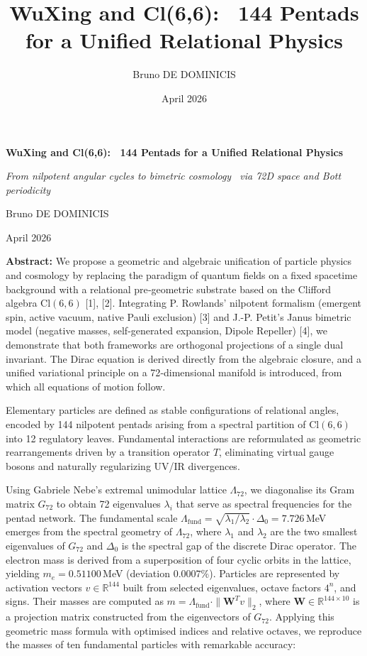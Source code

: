 \documentclass[11pt]{article}
\title{WuXing and Cl(6,6): ~144 Pentads for a Unified Relational
Physics}
\author{Bruno DE DOMINICIS}
\date{April 2026}
\renewcommand{\maketitle}{
  \begin{center}
  \vspace*{3cm}
  
  {\Huge\bfseries WuXing and Cl(6,6): ~144 Pentads for a Unified
Relational Physics\par}
  
  \vspace{2cm}
  
    {\Large\itshape From nilpotent angular cycles to bimetric cosmology
~via 72D space and Bott periodicity\par}
    
  \vspace{6cm}
  
  {\Large
  Bruno DE DOMINICIS
  \par}
  
  \vspace{5cm}
  
  {\large April 2026\par}
  
  
  \end{center}
  \clearpage  %
}
\begin{document}
\maketitle
\thispagestyle{firstpage}

\begin{center}
\begin{minipage}{0.85\textwidth}
\noindent \textbf{Abstract:} We propose a geometric and algebraic
unification of particle physics and cosmology by replacing the paradigm
of quantum fields on a fixed spacetime background with a relational
pre‑geometric substrate based on the Clifford algebra \(\text{Cl}(6,6)\)
{[}1{]}, {[}2{]}. Integrating P. Rowlands' nilpotent formalism (emergent
spin, active vacuum, native Pauli exclusion) {[}3{]} and J.-P. Petit's
Janus bimetric model (negative masses, self-generated expansion, Dipole
Repeller) {[}4{]}, we demonstrate that both frameworks are orthogonal
projections of a single dual invariant. The Dirac equation is derived
directly from the algebraic closure, and a unified variational principle
on a 72‑dimensional manifold is introduced, from which all equations of
motion follow.

Elementary particles are defined as stable configurations of relational
angles, encoded by 144 nilpotent pentads arising from a spectral
partition of \(\text{Cl}(6,6)\) into 12 regulatory leaves. Fundamental
interactions are reformulated as geometric rearrangements driven by a
transition operator \(T\), eliminating virtual gauge bosons and
naturally regularizing UV/IR divergences.

Using Gabriele Nebe's extremal unimodular lattice \(\Lambda_{72}\), we
diagonalise its Gram matrix \(G_{72}\) to obtain 72 eigenvalues
\(\lambda_i\) that serve as spectral frequencies for the pentad network.
The fundamental scale
\(\Lambda_{\text{fund}} = \sqrt{\lambda_1 / \lambda_2} \cdot \Delta_0 = 7.726\)\,MeV
emerges from the spectral geometry of \(\Lambda_{72}\), where
\(\lambda_1\) and \(\lambda_2\) are the two smallest eigenvalues of
\(G_{72}\) and \(\Delta_0\) is the spectral gap of the discrete Dirac
operator. The electron mass is derived from a superposition of four
cyclic orbits in the lattice, yielding \(m_e = 0.51100\)\,MeV (deviation
\(0.0007\%\)). Particles are represented by activation vectors
\(v \in \mathbb{R}^{144}\) built from selected eigenvalues, octave
factors \(4^{n}\), and signs. Their masses are computed as
\(m = \Lambda_{\text{fund}} \cdot \|\mathbf{W}^T v\|_2\), where
\(\mathbf{W} \in \mathbb{R}^{144\times 10}\) is a projection matrix
constructed from the eigenvectors of \(G_{72}\). Applying this geometric
mass formula with optimised indices and relative octaves, we reproduce
the masses of ten fundamental particles with remarkable accuracy:


\end{minipage}
\end{center}
\end{document}
